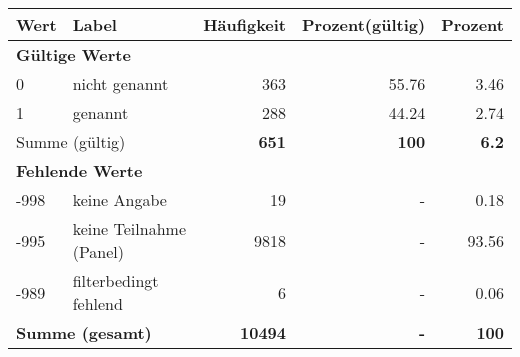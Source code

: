      \begin{longtable}{lXrrr}
     \toprule
     \textbf{Wert} & \textbf{Label} & \textbf{Häufigkeit} & \textbf{Prozent(gültig)} & \textbf{Prozent} \\
     \endhead
     \midrule
     \multicolumn{5}{l}{\textbf{Gültige Werte}}\\

     0 &
     \multicolumn{1}{X}{ nicht genannt   } &


       \num{363} &
       \num[round-mode=places,round-precision=2]{55.76} &
         \num[round-mode=places,round-precision=2]{3.46} \\

     1 &
     \multicolumn{1}{X}{ genannt   } &


       \num{288} &
       \num[round-mode=places,round-precision=2]{44.24} &
         \num[round-mode=places,round-precision=2]{2.74} \\
     \midrule
     \multicolumn{2}{l}{Summe (gültig)} &
       \textbf{\num{651}} &
     \textbf{\num{100}} &
       \textbf{\num[round-mode=places,round-precision=2]{6.2}} \\
     \multicolumn{5}{l}{\textbf{Fehlende Werte}}\\
       -998 &
       keine Angabe &
         \num{19} &
        - &
         \num[round-mode=places,round-precision=2]{0.18} \\
       -995 &
       keine Teilnahme (Panel) &
         \num{9818} &
        - &
         \num[round-mode=places,round-precision=2]{93.56} \\
       -989 &
       filterbedingt fehlend &
         \num{6} &
        - &
         \num[round-mode=places,round-precision=2]{0.06} \\
     \midrule
     \multicolumn{2}{l}{\textbf{Summe (gesamt)}} &
          \textbf{\num{10494}} &
        \textbf{-} &
        \textbf{\num{100}} \\
     \bottomrule
     \end{longtable}
     
